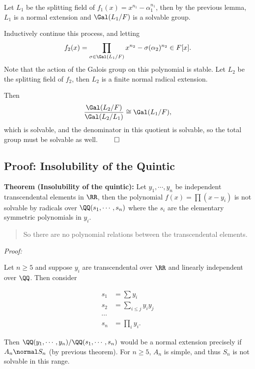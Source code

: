 Let \(L_1\) be the splitting field of
\(f_1(x) = x^{n_1} - \alpha_1^{n_1}\), then by the previous lemma,
\(L_1\) is a normal extension and \(\Gal(L_1/F)\) is a solvable group.

Inductively continue this process, and letting
\begin{align*}
f_2(x) = \prod_{\sigma \in \Gal(L_1/F)} x^{n_2} - \sigma(\alpha_2)^{n_2} \in F[x]
.\end{align*} Note that the action of the Galois group on this
polynomial is stable. Let \(L_2\) be the splitting field of \(f_2\),
then \(L_2\) is a finite normal radical extension.

Then
\begin{align*}
\frac{ \Gal(L_2/F) }{ \Gal(L_2/L_1) } \cong \Gal(L_1/F)
,\end{align*} which is solvable, and the denominator in this quotient is
solvable, so the total group must be solvable as well. \(\qed\)

\hypertarget{proof-insolubility-of-the-quintic}{%
\subsection{Proof: Insolubility of the
Quintic}\label{proof-insolubility-of-the-quintic}}

\textbf{Theorem (Insolubility of the quintic):} Let \(y_1, \cdots, y_n\)
be independent transcendental elements in \(\RR\), then the polynomial
\(f(x) = \prod (x-y_i)\) is not solvable by radicals over
\(\QQ(s_1, \cdots, s_n)\) where the \(s_i\) are the elementary symmetric
polynomials in \(y_i\).

\begin{quote}
So there are no polynomial relations between the transcendental
elements.
\end{quote}

\emph{Proof:}

Let \(n\geq 5\) and suppose \(y_i\) are transcendental over \(\RR\) and
linearly independent over \(\QQ\). Then consider

\begin{align*}
s_1 &= \sum y_i \\
s_2 &= \sum_{i\leq j} y_i y_j \\
\cdots \\
s_n &= \prod_i y_i
.\end{align*}

Then \(\QQ(y_1, \cdots, y_n)/ \QQ(s_1, \cdots, s_n)\) would be a normal
extension precisely if \(A_n \normal S_n\) (by previous theorem). For
\(n\geq 5\), \(A_n\) is simple, and thus \(S_n\) is not solvable in this
range.

